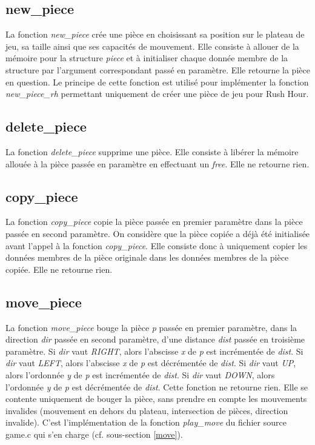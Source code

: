 \documentclass{report}
\begin{document}
\subsection{new\_piece}
La fonction \emph{new\_piece} crée une pièce en choisissant sa position sur le plateau de jeu, sa taille ainsi que ses capacités de mouvement. Elle consiste à allouer de la mémoire pour la structure \emph{piece} et à initialiser chaque donnée membre de la structure par l'argument correspondant passé en paramètre. Elle retourne la pièce en question. Le principe de cette fonction est utilisé pour implémenter la fonction \emph{new\_piece\_rh} permettant uniquement de créer une pièce de jeu pour Rush Hour.
\subsection{delete\_piece}
\label{del}
La fonction \emph{delete\_piece} supprime une pièce. Elle consiste à libérer la mémoire allouée à la pièce passée en paramètre en effectuant un \emph{free}. Elle ne retourne rien.
\subsection{copy\_piece}
\label{copy}
La fonction \emph{copy\_piece} copie la pièce passée en premier paramètre dans la pièce passée en second paramètre. On considère que la pièce copiée a déjà été initialisée avant l'appel à la fonction \emph{copy\_piece}. Elle consiste donc à uniquement copier les données membres de la pièce originale dans les données membres de la pièce copiée. Elle ne retourne rien.
\subsection{move\_piece}
La fonction \emph{move\_piece} bouge la pièce \emph{p} passée en premier paramètre, dans la direction \emph{dir} passée en second paramètre, d'une distance \emph{dist} passée en troisième paramètre. Si \emph{dir} vaut \emph{RIGHT}, alors l'abscisse \emph{x} de \emph{p} est incrémentée de \emph{dist}. Si \emph{dir} vaut \emph{LEFT}, alors l'abscisse \emph{x} de \emph{p} est décrémentée de \emph{dist}. Si \emph{dir} vaut \emph{UP}, alors l'ordonnée \emph{y} de \emph{p} est incrémentée de \emph{dist}. Si \emph{dir} vaut \emph{DOWN}, alors l'ordonnée \emph{y} de \emph{p} est décrémentée de \emph{dist}. Cette fonction ne retourne rien. Elle se contente uniquement de bouger la pièce, sans prendre en compte les mouvements invalides (mouvement en dehors du plateau, intersection de pièces, direction invalide). C'est l'implémentation de la fonction \emph{play\_move} du fichier source game.c qui s'en charge (cf. sous-section \ref{move}).
\end{document}
